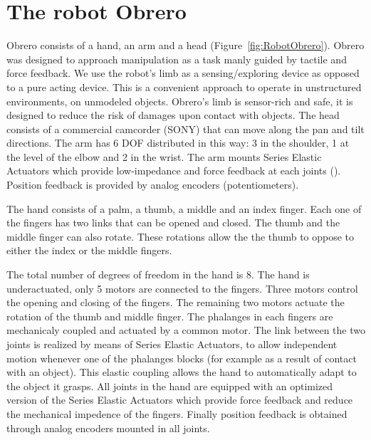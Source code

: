 \section{The robot Obrero}
\label{sec:platform}

Obrero \cite{obrero} 
consists of a hand, an arm and a head (Figure~\ref{fig:RobotObrero}). 
Obrero was designed to approach manipulation as a task manly guided by
tactile and force feedback.
We use the robot's limb as a sensing/exploring device as opposed 
to a pure acting device. This is a convenient approach to operate 
in unstructured environments, on unmodeled objects. 
Obrero's limb is sensor-rich and
safe, it is designed to reduce the risk of damages upon contact
with objects. The head consists of a commercial camcorder (SONY) 
that can move along the pan and tilt directions. The arm has 6 
DOF distributed in this way: 3 in the shoulder, 1 at the level of 
the elbow and 2 in the wrist. The arm mounts Series Elastic Actuators 
\cite{williamson95series} which provide low-impedance and force feedback 
at each joints (\cite{domo}). Position feedback is provided by 
analog encoders (potentiometers).

The hand consists of a palm, a thumb, a middle and an
index finger. Each one of the fingers has two links that can be
opened and closed. The thumb and the middle finger can also
rotate. These rotations allow the the thumb to oppose to either 
the index or the middle fingers.


The total number of degrees of freedom in the hand is 8. The hand 
is underactuated, only 5 motors are connected to the fingers. Three motors control
the opening and closing of the fingers. The remaining two motors actuate
the rotation of the thumb and middle finger. The phalanges in each fingers 
are mechanicaly coupled and actuated by a common motor. The link between 
the two joints is realized by means of Series 
Elastic Actuators, to allow independent motion 
whenever one of the phalanges blocks (for example as a result of contact 
with an object). This elastic coupling allows the hand to automatically 
adapt to the object it grasps. All joints in the hand are equipped with an 
optimized version of the Series Elastic Actuators \cite{actuator} which provide 
force feedback and reduce the mechanical impedence of the fingers. Finally 
position feedback is obtained through analog encoders mounted in all joints. 

